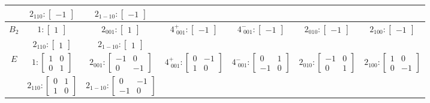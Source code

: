 \documentclass[fleqn,8pt,landscape]{jsarticle}
\begin{document}
\begin{longtable}{ccccccc}
& $ 2{}_{110}:\begin{bmatrix} -1 \end{bmatrix} $ & $ 2{}_{1-10}:\begin{bmatrix} -1 \end{bmatrix} $ & $  $ & $  $ & $  $ & $  $ \\ \hline
$ B_{2} $ & $ 1:\begin{bmatrix} 1 \end{bmatrix} $ & $ 2{}_{001}:\begin{bmatrix} 1 \end{bmatrix} $ & $ 4^{+}_{\,\,001}:\begin{bmatrix} -1 \end{bmatrix} $ & $ 4^{-}_{\,\,001}:\begin{bmatrix} -1 \end{bmatrix} $ & $ 2{}_{010}:\begin{bmatrix} -1 \end{bmatrix} $ & $ 2{}_{100}:\begin{bmatrix} -1 \end{bmatrix} $ \\
& $ 2{}_{110}:\begin{bmatrix} 1 \end{bmatrix} $ & $ 2{}_{1-10}:\begin{bmatrix} 1 \end{bmatrix} $ & $  $ & $  $ & $  $ & $  $ \\ \hline
$ E $ & $ 1:\begin{bmatrix} 1 & 0 \\ 0 & 1 \end{bmatrix} $ & $ 2{}_{001}:\begin{bmatrix} -1 & 0 \\ 0 & -1 \end{bmatrix} $ & $ 4^{+}_{\,\,001}:\begin{bmatrix} 0 & -1 \\ 1 & 0 \end{bmatrix} $ & $ 4^{-}_{\,\,001}:\begin{bmatrix} 0 & 1 \\ -1 & 0 \end{bmatrix} $ & $ 2{}_{010}:\begin{bmatrix} -1 & 0 \\ 0 & 1 \end{bmatrix} $ & $ 2{}_{100}:\begin{bmatrix} 1 & 0 \\ 0 & -1 \end{bmatrix} $ \\
& $ 2{}_{110}:\begin{bmatrix} 0 & 1 \\ 1 & 0 \end{bmatrix} $ & $ 2{}_{1-10}:\begin{bmatrix} 0 & -1 \\ -1 & 0 \end{bmatrix} $ & $  $ & $  $ & $  $ & $  $ \\
\end{longtable}
\end{document}
